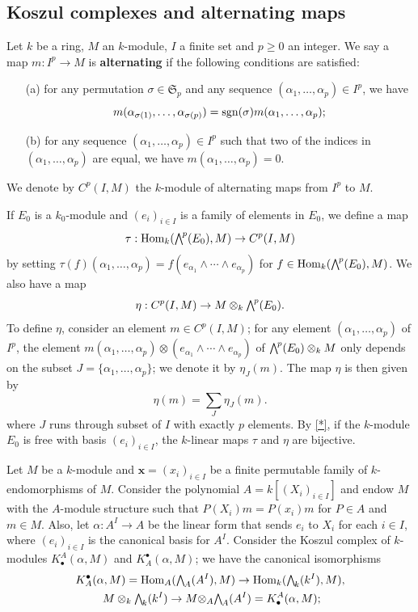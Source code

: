 \subsection{Koszul complexes and alternating maps}
Let $k$ be a ring, $M$ an $k$-module, $I$ a finite set and $p\geq 0$ an integer. We say a map $m:I^p\to M$ is \textbf{alternating} if the following conditions are satisfied:
\begin{enumerate}
\item[(a)] for any permutation $\sigma\in\mathfrak{S}_p$ and any sequence $(\alpha_1,\dots,\alpha_p)\in I^p$, we have
\[m(\alpha_{\sigma(1)},\dots,\alpha_{\sigma(p)})=\mathrm{sgn}(\sigma)m(\alpha_1,\dots,\alpha_p);\] 
\item[(b)] for any sequence $(\alpha_1,\dots,\alpha_p)\in I^p$ such that two of the indices in $(\alpha_1,\dots,\alpha_p)$ are equal, we have $m(\alpha_1,\dots,\alpha_p)=0$.
\end{enumerate}
We denote by $C^p(I,M)$ the $k$-module of alternating maps from $I^p$ to $M$.\par
If $E_0$ is a $k_0$-module and $(e_i)_{i\in I}$ is a family of elements in $E_0$, we define a map
\[\tau:\Hom_k(\bigw^p(E_0),M)\to C^p(I,M)\]
by setting $\tau(f)(\alpha_1,\dots,\alpha_p)=f(e_{\alpha_1}\wedge\cdots\wedge e_{\alpha_p})$ for $f\in\Hom_k(\bigw^p(E_0),M)$. We also have a map
\[\eta:C^p(I,M)\to M\otimes_k\bigw^p(E_0).\]
To define $\eta$, consider an element $m\in C^p(I,M)$; for any element $(\alpha_1,\dots,\alpha_p)$ of $I^p$, the element $m(\alpha_1,\dots,\alpha_p)\otimes(e_{\alpha_1}\wedge\cdots\wedge e_{\alpha_p})$ of $\bigw^p(E_0)\otimes_kM$ only depends on the subset $J=\{\alpha_1,\dots,\alpha_p\}$; we denote it by $\eta_J(m)$. The map $\eta$ is then given by
\[\eta(m)=\sum_{J}\eta_J(m).\]
where $J$ runs through subset of $I$ with exactly $p$ elements. By \cref{*}, if the $k$-module $E_0$ is free with basis $(e_i)_{i\in I}$, the $k$-linear maps $\tau$ and $\eta$ are bijective.\par
Let $M$ be a $k$-module and $\bm{x}=(x_i)_{i\in I}$ be a finite permutable family of $k$-endomorphisms of $M$. Consider the polynomial $A=k[(X_i)_{i\in I}]$ and endow $M$ with the $A$-module structure such that $P(X_i)m=P(x_i)m$ for $P\in A$ and $m\in M$. Also, let $\alpha:A^I\to A$ be the linear form that sends $e_i$ to $X_i$ for each $i\in I$, where $(e_i)_{i\in I}$ is the canonical basis for $A^I$. Consider the Koszul complex of $k$-modules $K_\bullet^A(\alpha,M)$ and $K^\bullet_A(\alpha,M)$; we have the canonical isomorphisms
\begin{align*}
K_A^\bullet(\alpha,M)=\Hom_A(\bigw_A(A^I)&,M)\to\Hom_k(\bigw_k(k^I),M),\\
M\otimes_k\bigw_k(k^I)\to M\otimes_A&\bigw_A(A^I)=K^A_\bullet(\alpha,M);
\end{align*}
